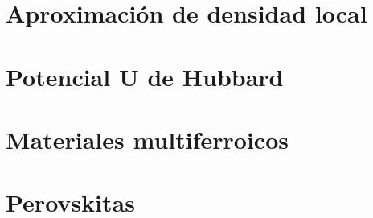 \section{Aproximaci\'on de densidad local}



%


\section{Potencial U de Hubbard}



\section{Materiales multiferroicos}



\section{Perovskitas}

